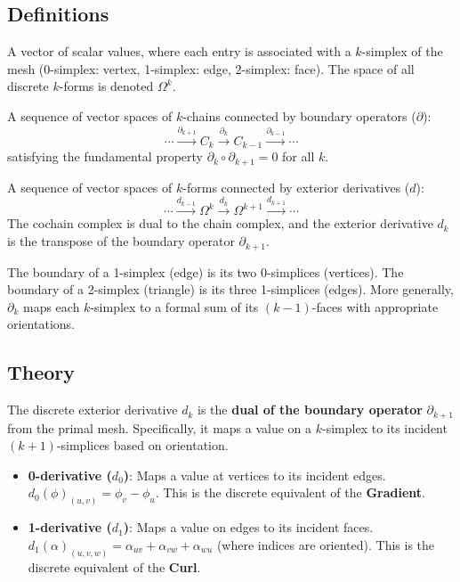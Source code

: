 \subsection{Definitions}
\begin{definition}\label{def:ext_k_form}
A vector of scalar values, where each entry is associated with a $k$-simplex of the mesh (0-simplex: vertex, 1-simplex: edge, 2-simplex: face). The space of all discrete $k$-forms is denoted $\Omega^k$.
\end{definition}

\begin{definition}\label{def:chain_complex}
A sequence of vector spaces of $k$-chains connected by boundary operators ($\partial$):
\[
\cdots \xrightarrow{\partial_{k+1}} C_k \xrightarrow{\partial_k} C_{k-1} \xrightarrow{\partial_{k-1}} \cdots
\]
satisfying the fundamental property $\partial_{k} \circ \partial_{k+1} = 0$ for all $k$.
\end{definition}

\begin{definition}\label{def:cochain_complex}
A sequence of vector spaces of $k$-forms connected by exterior derivatives ($d$):
\[
\cdots \xrightarrow{d_{k-1}} \Omega^k \xrightarrow{d_k} \Omega^{k+1} \xrightarrow{d_{k+1}} \cdots
\]
The cochain complex is dual to the chain complex, and the exterior derivative $d_k$ is the transpose of the boundary operator $\partial_{k+1}$.
\end{definition}

\begin{definition}\label{def:boundary_relationship}
The boundary of a 1-simplex (edge) is its two 0-simplices (vertices). The boundary of a 2-simplex (triangle) is its three 1-simplices (edges). More generally, $\partial_k$ maps each $k$-simplex to a formal sum of its $(k-1)$-faces with appropriate orientations.
\end{definition}

\subsection{Theory}
The discrete exterior derivative $d_k$ is the \textbf{dual of the boundary operator} $\partial_{k+1}$ from the primal mesh. Specifically, it maps a value on a $k$-simplex to its incident $(k+1)$-simplices based on orientation.
\begin{itemize}
    \item \textbf{0-derivative ($d_0$)}: Maps a value at vertices to its incident edges. $d_0(\phi)_{(u,v)} = \phi_v - \phi_u$. This is the discrete equivalent of the \textbf{Gradient}.
    \item \textbf{1-derivative ($d_1$)}: Maps a value on edges to its incident faces. $d_1(\alpha)_{(u,v,w)} = \alpha_{uv} + \alpha_{vw} + \alpha_{wu}$ (where indices are oriented). This is the discrete equivalent of the \textbf{Curl}.
\end{itemize}

